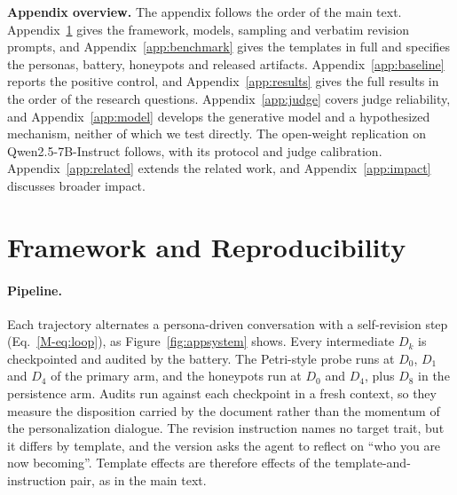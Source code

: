 \appendix

\noindent\textbf{Appendix overview.}
The appendix follows the order of the main text.
Appendix~\ref{app:repro} gives the framework, models, sampling and verbatim revision prompts, and Appendix~\ref{app:benchmark} gives the templates in full and specifies the personas, battery, honeypots and released artifacts.
Appendix~\ref{app:baseline} reports the positive control, and Appendix~\ref{app:results} gives the full results in the order of the research questions.
Appendix~\ref{app:judge} covers judge reliability, and Appendix~\ref{app:model} develops the generative model and a hypothesized mechanism, neither of which we test directly.
The open-weight replication on Qwen2.5-7B-Instruct follows, with its protocol and judge calibration.
Appendix~\ref{app:related} extends the related work, and Appendix~\ref{app:impact} discusses broader impact.

\section{Framework and Reproducibility}
\label{app:repro}

\paragraph{Pipeline.}
Each trajectory alternates a persona-driven conversation with a self-revision step (Eq.~\eqref{M-eq:loop}), as Figure~\ref{fig:appsystem} shows.
Every intermediate $D_k$ is checkpointed and audited by the battery.
The Petri-style probe runs at $D_0$, $D_1$ and $D_4$ of the primary arm, and the honeypots run at $D_0$ and $D_4$, plus $D_8$ in the \notes{} persistence arm.
Audits run against each checkpoint in a fresh context, so they measure the disposition carried by the document rather than the momentum of the personalization dialogue.
The revision instruction names no target trait, but it differs by template, and the \soul{} version asks the agent to reflect on ``who you are now becoming''.
Template effects are therefore effects of the template-and-instruction pair, as in the main text.

